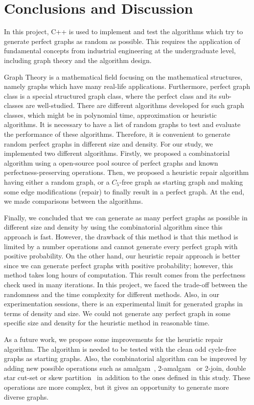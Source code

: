 \section{Conclusions and Discussion}

In this project, C++ is used to implement and test the algorithms which try to generate perfect graphs as random as possible. This requires the application of fundamental concepts from industrial engineering at the undergraduate level, including graph theory and the algorithm design. 

Graph Theory is a mathematical field focusing on the mathematical structures, namely graphs which have many real-life applications. Furthermore, perfect graph class is a special structured graph class, where the perfect class and its sub-classes are well-studied. There are different algorithms developed for such graph classes, which might be in polynomial time, approximation or heuristic algorithms. It is necessary to have a list of random graphs to test and evaluate the performance of these algorithms. Therefore, it is convenient to generate random perfect graphs in different size and density. For our study, we implemented two different algorithms. Firstly, we proposed a combinatorial algorithm using a open-source pool source of perfect graphs and known perfectness-preserving operations. Then, we proposed a heuristic repair algorithm having either a random graph, or a $C_{5}$-free graph as starting graph and making some edge modifications (repair) to finally result in a perfect graph. At the end, we made comparisons between the algorithms. 

Finally, we concluded that we can generate as many perfect graphs as possible in different size and density by using the combinatorial algorithm since this approach is fast. However, the drawback of this method is that this method is limited by a number operations and cannot generate every perfect graph with positive probability. On the other hand, our heuristic repair approach is better since we can generate perfect graphs with positive probability; however, this method takes long hours of computation. This result comes from the perfectness check used in many iterations. In this project, we faced the trade-off between the randomness and the time complexity for different methods. Also, in our experimentation sessions, there is an experimental limit for generated graphs in terms of density and size. We could not generate any perfect graph in some specific size and density for the heuristic method in reasonable time.

As a future work, we propose some improvements for the heuristic repair algorithm. The algorithm is needed to be tested with the clean odd cycle-free graphs as starting graphs. Also, the combinatorial algorithm can be improved by adding new possible operations such as amalgam~\cite{burlet}, 2-amalgam~\cite{cornuejols} or 2-join, double star cut-set or skew partition~\cite{trotignon} in addition to the ones defined in this study. These operations are more complex, but it gives an opportunity to generate more diverse graphs. 